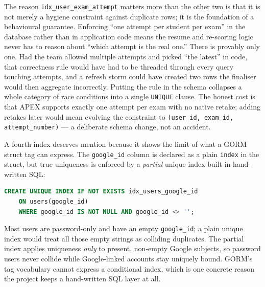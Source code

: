 The reason \texttt{idx\_user\_exam\_attempt} matters more than the other two
is that it is not merely a hygiene constraint against duplicate rows; it is
the foundation of a behavioural guarantee. Enforcing ``one attempt per
student per exam'' in the database rather than in application code means the
resume and re-scoring logic never has to reason about ``which attempt is the
real one.'' There is provably only one. Had the team allowed multiple
attempts and picked ``the latest'' in code, that correctness rule would have
had to be threaded through every query touching attempts, and a refresh storm
could have created two rows the finaliser would then aggregate incorrectly.
Putting the rule in the schema collapses a whole category of race conditions
into a single \texttt{UNIQUE} clause. The honest cost is that APEX supports
exactly one attempt per exam with no native retake; adding retakes later
would mean evolving the constraint to \texttt{(user\_id, exam\_id,
attempt\_number)} --- a deliberate schema change, not an accident.

A fourth index deserves mention because it shows the limit of what a GORM
struct tag can express. The \texttt{google\_id} column is declared as a plain
\texttt{index} in the struct, but true uniqueness is enforced by a
\emph{partial} unique index built in hand-written SQL:

\begin{lstlisting}[language=SQL,caption={The partial unique index on google\_id (internal/database/migrations.go).},label={lst:google-idx}]
CREATE UNIQUE INDEX IF NOT EXISTS idx_users_google_id
    ON users(google_id)
    WHERE google_id IS NOT NULL AND google_id <> '';
\end{lstlisting}

Most users are password-only and have an empty \texttt{google\_id}; a plain
unique index would treat all those empty strings as colliding duplicates. The
partial index applies uniqueness \emph{only} to present, non-empty Google
subjects, so password users never collide while Google-linked accounts stay
uniquely bound. GORM's tag vocabulary cannot express a conditional index,
which is one concrete reason the project keeps a hand-written SQL layer at
all.

